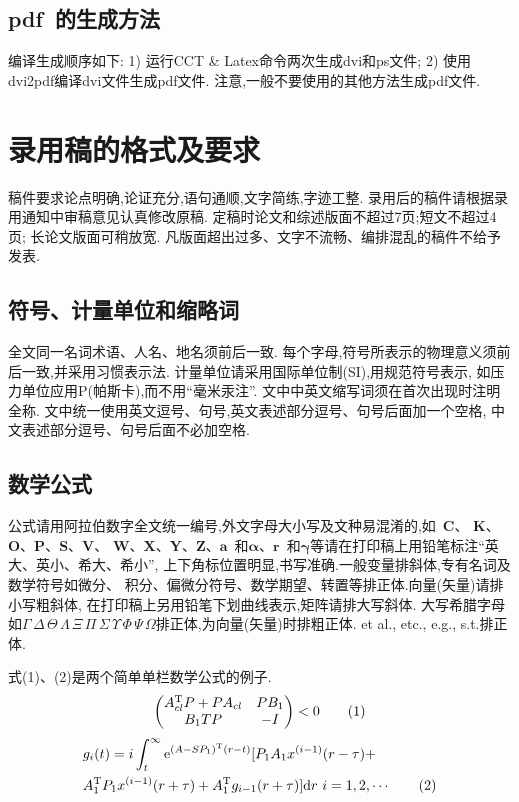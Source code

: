\documentclass[fontset=mac]{aas}
\begin{document}
\subsection{{\bf pdf}~的生成方法}

编译生成顺序如下: 1) 运行CCT \&
Latex命令两次生成dvi和ps文件; 2) 使用dvi2pdf编译dvi文件生成pdf文件.
注意,一般不要使用的其他方法生成pdf文件.



\section{录用稿的格式及要求}

稿件要求论点明确,论证充分,语句通顺,文字简练,字迹工整.
录用后的稿件请根据录用通知中审稿意见认真修改原稿.
定稿时论文和综述版面不超过7页;短文不超过4页; 长论文版面可稍放宽.
凡版面超出过多、文字不流畅、编排混乱的稿件不给予发表.

\subsection{符号、计量单位和缩略词}

全文同一名词术语、人名、地名须前后一致.
每个字母,符号所表示的物理意义须前后一致,并采用习惯表示法.
计量单位请采用国际单位制(SI),用规范符号表示,
如压力单位应用P(帕斯卡),而不用``毫米汞注''.
文中中英文缩写词须在首次出现时注明全称.
文中统一使用英文逗号、句号,英文表述部分逗号、句号后面加一个空格,
中文表述部分逗号、句号后面不必加空格.

\subsection{数学公式}

公式请用阿拉伯数字全文统一编号,外文字母大小写及文种易混淆的,如~{\bf C}、
{\bf K}、{\bf O}、{\bf P}、{\bf S}、{\bf V}、{\bf
W}、{\bf X}、{\bf Y}、{\bf Z}、${\pmb a}$~和${\pmb\alpha}$、${\pmb
r}$~和${\pmb\gamma}$等请在打印稿上用铅笔标注``英大、英小、希大、希小'',
上下角标位置明显,书写准确.一般变量排斜体,专有名词及数学符号如微分、
积分、偏微分符号、数学期望、转置等排正体.向量(矢量)请排小写粗斜体,
在打印稿上另用铅笔下划曲线表示,矩阵请排大写斜体.
大写希腊字母如$\Gamma\,\Delta\,\Theta\,\Lambda\,\Xi\,\Pi\,\Sigma\,
\Upsilon\,\Phi\,\Psi\,\Omega$排正体,为向量(矢量)时排粗正体. et al.,
etc., e.g., s.t.排正体.

式(1)、(2)是两个简单单栏数学公式的例子.
\begin{equation}
\begin{pmatrix}
A_{cl}^{\rm T}P+PA_{cl}&PB_1\\
B_1TP&-I
\end{pmatrix}
<0 \tag{1}
\end{equation}
\allowdisplaybreaks
\begin{align}
&{\sl g}_i(t)=i\int_t^\infty {\rm e}^{(A-SP_1)^{\rm T}(r-t)}[P_1A_1
x^{(i-1)}(r-\tau)+
\nonumber\\
&A_1^{\rm T}P_1 x^{(i-1)}(r+\tau)+A_1^ {\rm T}{\sl
g}_{i-1}(r+\tau)]{\rm d}r\ i=1,2,\cdots \tag{2}
\end{align}
\end{document}
